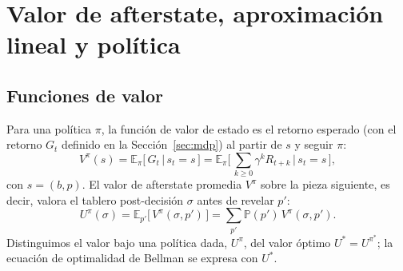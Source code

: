 \section{Valor de afterstate, aproximación lineal y política}
\label{sec:valor}

\subsection{Funciones de valor}
Para una política $\pi$, la función de valor de estado es el retorno esperado
(con el retorno $G_t$ definido en la Sección~\ref{sec:mdp}) al partir de $s$ y
seguir $\pi$:
\begin{equation}
    V^{\pi}(s) = \mathbb{E}_{\pi}\!\big[\, G_t \,\big|\, s_t = s \,\big]
    = \mathbb{E}_{\pi}\!\Big[\, \textstyle\sum_{k \ge 0} \gamma^{k} R_{t+k}
        \,\Big|\, s_t = s \,\Big],
    \label{eq:v-estado}
\end{equation}
con $s = (b, p)$. El valor de afterstate promedia $V^{\pi}$ sobre la pieza
siguiente, es decir, valora el tablero post-decisión $\sigma$ antes de revelar
$p'$:
\begin{equation}
    U^{\pi}(\sigma) = \mathbb{E}_{p'}\!\big[\, V^{\pi}(\sigma, p') \,\big]
    = \sum_{p'} \mathbb{P}(p')\, V^{\pi}(\sigma, p').
    \label{eq:u-def}
\end{equation}
Distinguimos el valor bajo una política dada, $U^{\pi}$, del valor óptimo
$U^{*} = U^{\pi^{*}}$; la ecuación de optimalidad de Bellman se expresa con
$U^{*}$.

